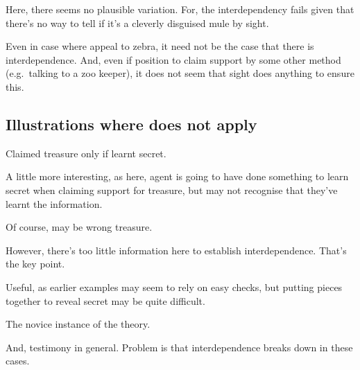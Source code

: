 \begin{note}
  Here, there seems no plausible variation.
  For, the interdependency fails given that there's no way to tell if it's a cleverly disguised mule by sight.

  Even in case where appeal to zebra, it need not be the case that there is interdependence.
  And, even if position to claim support by some other method (e.g.\ talking to a zoo keeper), it does not seem that sight does anything to ensure this.
\end{note}

\subsection{Illustrations where \nI{} does not apply}

\begin{note}
  \begin{illustration}
    Claimed treasure only if learnt secret.
  \end{illustration}
  A little more interesting, as here, agent is going to have done something to learn secret when claiming support for treasure, but may not recognise that they've learnt the information.

  Of course, may be wrong treasure.

  However, there's too little information here to establish interdependence.
  That's the key point.

  Useful, as earlier examples may seem to rely on easy checks, but putting pieces together to reveal secret may be quite difficult.
\end{note}

\begin{note}
  The novice instance of the theory.

  And, testimony in general.
  Problem is that interdependence breaks down in these cases.
\end{note}

